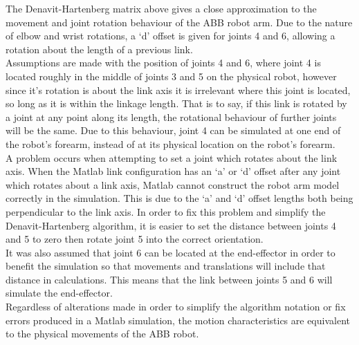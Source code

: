 \documentclass[11pt,a4paper]{report}
\begin{document}
The Denavit-Hartenberg matrix above gives a close approximation to the movement and joint rotation behaviour of the ABB robot arm. Due to the nature of elbow and wrist rotations, a `d' offset is given for joints 4 and 6, allowing a rotation about the length of a previous link.\\
Assumptions are made with the position of joints 4 and 6, where joint 4 is located roughly in the middle of joints 3 and 5 on the physical robot, however since it's rotation is about the link axis it is irrelevant where this joint is located, so long as it is within the linkage length. That is to say, if this link is rotated by a joint at any point along its length, the rotational behaviour of further joints will be the same. Due to this behaviour, joint 4 can be simulated at one end of the robot's forearm, instead of at its physical location on the robot's forearm.\\
A problem occurs when attempting to set a joint which rotates about the link axis. When the Matlab link configuration has an `a' or `d' offset after any joint which rotates about a link axis, Matlab cannot construct the robot arm model correctly in the simulation. This is due to the `a' and `d' offset lengths both being perpendicular to the link axis. In order to fix this problem and simplify the Denavit-Hartenberg algorithm, it is easier to set the distance between joints 4 and 5 to zero then rotate joint 5 into the correct orientation.\\
It was also assumed that joint 6 can be located at the end-effector in order to benefit the simulation so that movements and translations will include that distance in calculations. This means that the link between joints 5 and 6 will simulate the end-effector.\\
Regardless of alterations made in order to simplify the algorithm notation or fix errors produced in a Matlab simulation, the motion characteristics are equivalent to the physical movements of the ABB robot.
\end{document}
